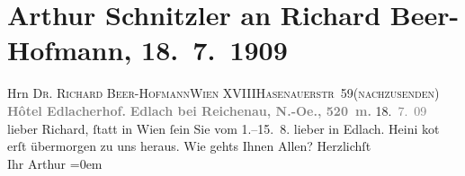 

         
         \renewcommand{\erwaehntePersonen}{Personen: Richard Beer-Hofmann, Heinrich Schnitzler}
         \renewcommand{\erwaehnteOrte}{Orte: Edlach, Hasenauerstraße, Hotel Edlacherhof, Wien, XVIII., Währing}
         \renewcommand{\erwaehnteWerke}{}
               \section[Arthur Schnitzler an Richard Beer-Hofmann, 18. 7. 1909]{ Arthur Schnitzler an Richard Beer-Hofmann, 18. 7. 1909}\nopagebreak{}\rehead{ }\begin{ledgroupsized}[t]{13cm}\normalsize\beginnumbering \toendnotes[C]{\smallbreak\pagebreak[2]} 
\pstart{}{\pb}Hrn \textsc{Dr. Richard
                     Beer-Hofmann}\pend{}\pstart{}\textsc{Wien XVIII}\pend{}\pstart{}\textsc{Hasenauerstr 59}\pend{}\pstart{}\textsc{(nachzusenden)}\pend{}{\bigskip}\pstart
           \noindent{}\centering{}{\pb}\textcolor{gray}{\textbf{Hôtel Edlacherhof.}}\pend
           \pstart
           \noindent{}\centering{}\textcolor{gray}{\textbf{Edlach bei Reichenau, N.-Oe., 520 m.}}\pend
           \pstart
           \raggedleft{}{\pb}18. \textcolor{gray}{7. 09}\pend
           \pstart
           lieber Richard, ſtatt in Wien
               ſein Sie vom 1.–15. 8. lieber in Edlach. Heini ko{\geminationm}t erſt übermorgen zu uns heraus. Wie gehts Ihnen
               Allen?\pend
           \pstart
           Herzlichſt{\\[\baselineskip]}Ihr \spacefill\mbox{Arthur}\pend
           \leftskip=0em{}
         
         \endnumbering{}\end{ledgroupsized}  \newcommand{\dateiname}{L01858}\newcommand{\titel}{Arthur Schnitzler an Richard Beer-Hofmann, 18. 7. 1909}\newcommand{\editorInnen}{Martin Anton Müller und Gerd-Hermann Susen}
      